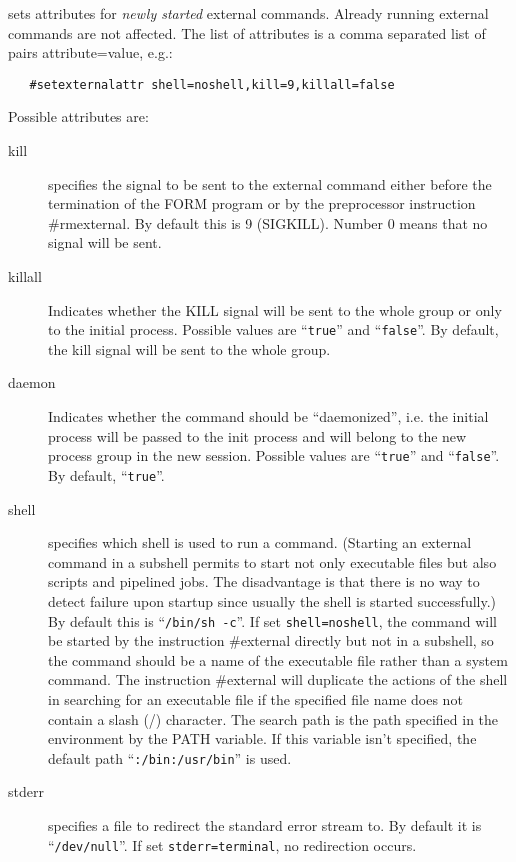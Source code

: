 \noindent sets attributes for {\em newly started} 
external commands. Already running external commands are not affected. The 
list of attributes is a comma separated list of pairs attribute=value, 
e.g.:
\begin{verbatim}
   #setexternalattr shell=noshell,kill=9,killall=false
\end{verbatim}
Possible attributes are:
\begin{description}
\item[kill]
specifies the signal to be sent to the external command either before the 
termination of the FORM program or by the preprocessor instruction 
\#rmexternal. By default this is 9 
(SIGKILL). Number 0 means that no signal will be 
sent.
\item[killall] Indicates whether the KILL 
signal will be sent to the whole group or only to the initial process. 
Possible values are ``\verb|true|'' and ``\verb|false|''. By default, the 
kill signal will be sent to the whole group.
\item[daemon]
Indicates whether the command should be ``daemonized'', i.e. 
the initial process will be passed to the init process and will belong
to the new process group in the new session.  
Possible values are ``\verb|true|'' and ``\verb|false|''. By default, 
``\verb|true|''.
\item[shell]
specifies which shell is used to run a command. (Starting an 
external command in a subshell permits to start not only executable files 
but also scripts and pipelined jobs. The disadvantage is that there is no 
way to detect failure upon startup since usually the shell is started 
successfully.) By default this is ``\verb|/bin/sh -c|''.  If set 
\verb|shell=noshell|, the command will be started by the instruction 
\#external directly but not in a subshell, so the command 
should be a name of the executable file rather than a system command. The 
instruction \#external will duplicate the actions of the shell in searching 
for an executable file if the specified file name does not contain a slash 
(/) character.  The search path is the path specified in 
the environment by the PATH variable.  If this variable isn't 
specified, the default path ``\verb|:/bin:/usr/bin|'' is used.
\item[stderr]
specifies a file to redirect the standard error stream 
to. By default it is ``\verb|/dev/null|''. If set \verb|stderr=terminal|,
no redirection occurs.
\end{description}
